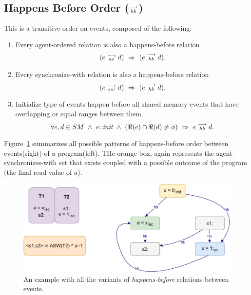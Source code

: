         
    \subsection{Happens Before Order ($\stackrel{\longrightarrow}{_{hb}}$)}
        This is a transitive order on events, composed of the following:
        \begin{enumerate}
            \item Every agent-ordered relation is also a happens-before relation 
                \begin{align*}
                    (\reln{e}{ao}{d}) \ \Rightarrow{} \ (\reln{e}{hb}{d}).    
                \end{align*}
                
            \item Every synchronize-with relation is also a happens-before relation 
                \begin{align*}
                    (\reln{e}{sw}{d}) \ \Rightarrow{} \ (\reln{e}{hb}{d}).    
                \end{align*}
                 
            \item Initialize type of events happen before all shared memory events that have overlapping or equal ranges between them. 
                \begin{align*}
                    \forall e,d \in SM \ \wedge \ 
                    \et{e}{init} \ \wedge \ 
                    (\Re(e) \cap \Re(d) \neq \phi)
                    \ \Rightarrow{} \ 
                    \reln{e}{hb}{d}.
                \end{align*}          
        \end{enumerate}
        Figure~\ref{model:happens-before} summarizes all possible patterns of happens-before order between events(right) of a program(left).
        THe orange box, again represents the agent-synchronizes-with set that exists coupled with a possible outcome of the program (the final read value of $a$).
        \begin{figure}[H]
            \centering
            \includegraphics[scale=0.7]{3.ECMAScriptMemoryModel/Happens-before.pdf}
            \caption{An example with all the variants of \textit{happens-before} relations between events.}
            \label{model:happens-before}
        \end{figure}
    
